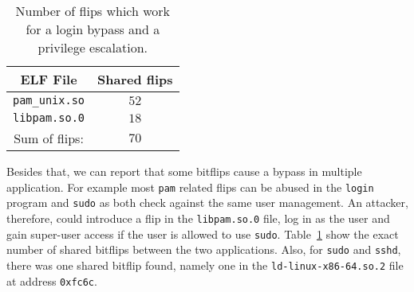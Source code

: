 \begin{table}[!htb]
\centering
\begin{tabular}{c|c}
ELF File               & Shared flips \\ \hline
\texttt{pam\_unix.so} & $52$ \\
\texttt{libpam.so.0} & $18$ \\ \hline
Sum of flips:                 & $70$
\end{tabular}
\caption{Number of flips which work for a login bypass and a 
privilege escalation.}
\label{tab:loginsudo}
\end{table}

Besides that, we can report that some bitflips cause a bypass in multiple
application. For example most \texttt{pam} related flips can be abused in the
\texttt{login} program and \texttt{sudo} as both check against the same user
management. An attacker, therefore, could introduce a flip in the
\texttt{libpam.so.0} file, log in as the user and gain super-user access if the
user is allowed to use \texttt{sudo}. Table~\ref{tab:loginsudo} show the exact
number of shared bitflips between the two applications. Also, for \texttt{sudo}
and \texttt{sshd}, there was one shared bitflip found, namely one in the
\texttt{ld-linux-x86-64.so.2} file at address \texttt{0xfc6c}.

